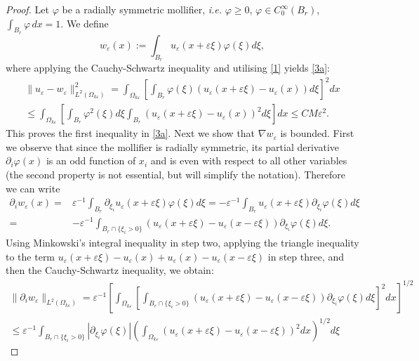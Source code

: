 \documentclass[11pt]{article}
\newcommand\e {\varepsilon}
\theoremstyle{remark}
\begin{document}
\begin{appendices}
\begin{proof}
	Let $\varphi$ be a radially symmetric mollifier, {\it i.e.} $\varphi\geq 0$, $\varphi \in C^\infty_0(B_r)$, $\int_{B_r}\varphi\,dx=1$. We define
	\begin{equation} \label{can1}
		w_\e(x):= \int_{B_r} u_\e(x+\e\xi) \varphi(\xi)d\xi,
	\end{equation}
	where
	applying the Cauchy-Schwartz inequality  and utilising  \eqref{1} yields \eqref{3a}:
	\begin{equation*}
		\begin{aligned}
			\|u_\e - w_\e\|_{L^2(\Omega_{k\e})}^2 =	\int_{\Omega_{k\e}}\left[  \int_{B_r} \varphi(\xi) (u_\e(x+\e\xi) - u_\e(x))d\xi \right]^2 dx
			\\
			\leq \int_{\Omega_{k\e}} \left[ \int_{B_r} \varphi^2(\xi) d\xi  \int_{B_r
			}(u_\e(x+\e\xi) - u_\e(x))^2d\xi \right] dx \leq CM\e^2.
		\end{aligned}
	\end{equation*}
	This proves the first inequality in \eqref{3a}.
	Next we show that $\nabla w_\e$ is bounded. First we observe that since the mollifier is radially symmetric, its partial derivative $\partial_i \varphi(x)$ is an odd function of $x_i$   and is even with respect to all other variables (the second property is not essential, but will simplify the notation). Therefore we can write
	\begin{equation*}
		\begin{aligned}
			\partial_i w_\e(x)  =&	 \e^{-1} \int_{B_r} \partial_{\xi_i} u_\e(x+\e\xi) \varphi(\xi)d\xi = -  \e^{-1} \int_{B_r} u_\e(x+\e\xi) \partial_{\xi_i} \varphi(\xi)d\xi
			\\
			= &-  \e^{-1} \int_{B_r \cap \{\xi_i>0\}} (u_\e(x+\e\xi) - u_\e(x-\e\xi))\partial_{\xi_i} \varphi(\xi)d\xi.
		\end{aligned}
	\end{equation*}
	Using Minkowski's integral inequality in step two, applying the triangle inequality to the term $u_\e(x+\e\xi) - u_\e(x) + u_\e(x) - u_\e(x-\e\xi)$ in step three, and then the Cauchy-Schwartz inequality, we obtain:
	\begin{equation} \label{can2}
		\begin{aligned}
			\|\partial_i w_\e\|_{L^2(\Omega_{k\e})}=\e^{-1}\left[	\int_{\Omega_{k\e}}\left[  \int_{B_r\cap \{\xi_i>0\}} (u_\e(x+\e\xi) - u_\e(x-\e\xi))\partial_{\xi_i} \varphi(\xi) d\xi \right]^2 dx \right]^{1/2}
			\\
			\leq \e^{-1}\int_{B_r\cap \{\xi_i>0\}} |\partial_{\xi_i} \varphi(\xi)|\left( \int_{\Omega_{ k\e}} (u_\e(x+\e\xi) - u_\e(x-\e\xi))^2 dx \right)^{1/2} d\xi

\end{aligned}
\end{equation}
\end{proof}
\end{appendices}
\end{document}

